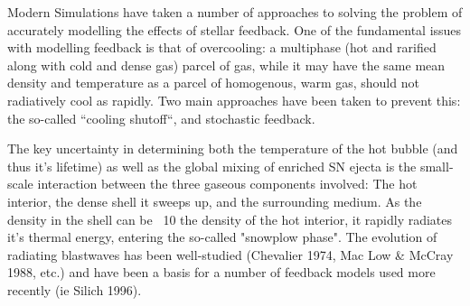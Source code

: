 \documentclass{report}
\begin{document}
\fontsize{30pt}{1em}\selectfont
\color{white}
Modern Simulations have taken a number of approaches to solving the problem of
accurately modelling the effects of stellar feedback.  One of the fundamental
issues with modelling feedback is that of overcooling: a multiphase (hot and
rarified along with cold and dense gas) parcel of gas, while it may have the
same mean density and temperature as a parcel of homogenous, warm gas, should
not radiatively cool as rapidly.  Two main approaches have been taken to prevent
this:  the so-called ``cooling shutoff``, and stochastic feedback.

The key uncertainty in determining both the temperature of the hot bubble (and
thus it's lifetime) as well as the global mixing of enriched SN ejecta is the
small-scale interaction between the three gaseous components involved:  The hot
interior, the dense shell it sweeps up, and the surrounding medium.  As the
density in the shell can be ~10 the density of the hot interior, it rapidly
radiates it's thermal energy, entering the so-called "snowplow phase".  The
evolution of radiating blastwaves has been well-studied (Chevalier 1974, Mac Low
\& McCray 1988, etc.) and have been a basis for a number of feedback models used
more recently (ie Silich 1996).  
\end{document}
